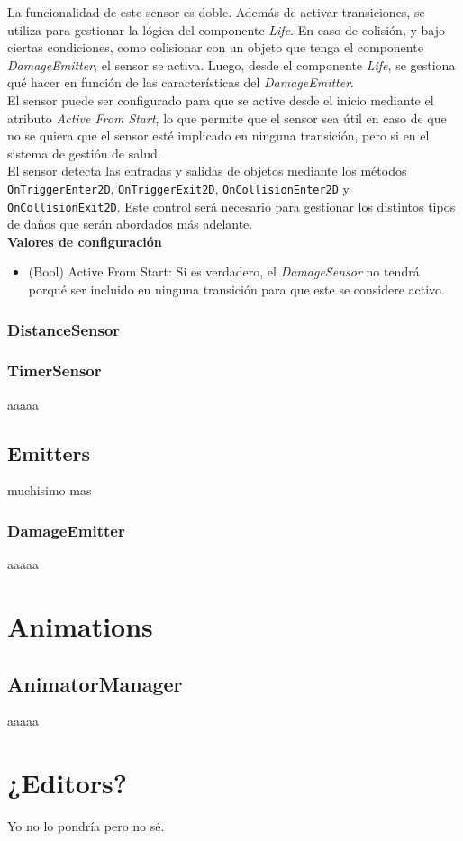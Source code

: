 La funcionalidad de este sensor es doble. Además de activar transiciones, se utiliza para gestionar la lógica del componente \textit{Life}. En caso de colisión, y bajo ciertas condiciones, como colisionar con un objeto que tenga el componente \textit{DamageEmitter}, el sensor se activa. Luego, desde el componente \textit{Life}, se gestiona qué hacer en función de las características del \textit{DamageEmitter}.\\

El sensor puede ser configurado para que se active desde el inicio mediante el atributo \textit{Active From Start}, lo que permite que el sensor sea útil en caso de que no se quiera que el sensor esté implicado en ninguna transición, pero si en el sistema de gestión de salud.\\


El sensor detecta las entradas y salidas de objetos mediante los métodos \texttt{OnTriggerEnter2D}, \texttt{OnTriggerExit2D}, \texttt{OnCollisionEnter2D} y \texttt{OnCollisionExit2D}. Este control será necesario para gestionar los distintos tipos de daños que serán abordados más adelante.\\

\textbf{Valores de configuración}
\begin{itemize}
	\item (Bool) Active From Start: Si es verdadero, el \textit{DamageSensor} no tendrá porqué ser incluido en ninguna transición para que este se considere activo.
\end{itemize}

\subsubsection{DistanceSensor}

\subsubsection{TimerSensor}
aaaaa

\subsection{Emitters}
muchisimo mas
\subsubsection{DamageEmitter}
aaaaa

\section{Animations}
\subsection{AnimatorManager}
aaaaa

\section{¿Editors?}
Yo no lo pondría pero no sé.

